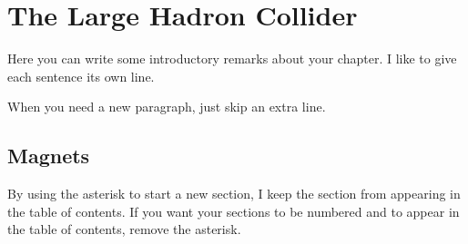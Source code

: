 

\chapter[The Large Hadron Collider][Top of Page Title]{The Large Hadron Collider}

Here you can write some introductory remarks about your chapter.
I like to give each sentence its own line.

When you need a new paragraph, just skip an extra line.

\section{Magnets}

By using the asterisk to start a new section, I keep the section from appearing in the table of contents.
If you want your sections to be numbered and to appear in the table of contents, remove the asterisk.

